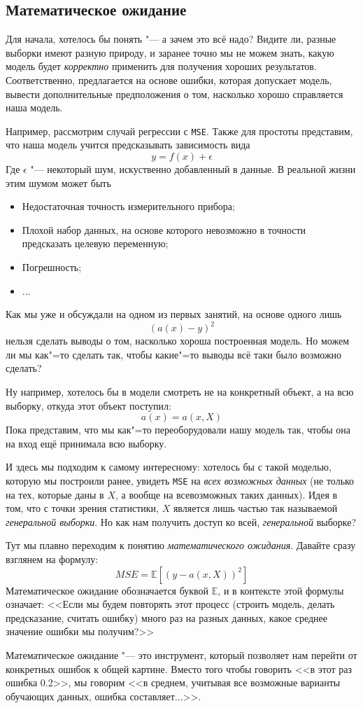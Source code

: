 \subsection*{Математическое ожидание}
Для начала, хотелось бы понять "--- а зачем это всё надо? Видите ли, разные выборки имеют разную природу, и заранее точно мы не можем знать, какую модель будет \textit{корректно} применить для получения хороших результатов. Соответственно, предлагается на основе ошибки, которая допускает модель, вывести дополнительные предположения о том, насколько хорошо справляется наша модель.

Например, рассмотрим случай регрессии с \texttt{MSE}. Также для простоты представим, что наша модель учится предсказывать зависимость вида
\[
y = f(x) + \epsilon
\]
Где $\epsilon$ "--- некоторый шум, искуственно добавленный в данные. В реальной жизни этим шумом может быть
\begin{itemize}
    \item Недостаточная точность измерительного прибора;
    \item Плохой набор данных, на основе которого невозможно в точности предсказать целевую переменную;
    \item Погрешность;
    \item ...
\end{itemize}

Как мы уже и обсуждали на одном из первых занятий, на основе одного лишь
\[
(a(x) - y)^2
\]
нельзя сделать выводы о том, насколько хороша построенная модель. Но можем ли мы как"=то сделать так, чтобы какие"=то выводы всё таки было возможно сделать?

Ну например, хотелось бы в модели смотреть не на конкретный объект, а на всю выборку, откуда этот объект поступил:
\[
a(x) = a(x, X)
\]
Пока представим, что мы как"=то переоборудовали нашу модель так, чтобы она на вход ещё принимала всю выборку.

\newpage

И здесь мы подходим к самому интересному: хотелось бы с такой моделью, которую мы построили ранее, увидеть \texttt{MSE} на \textit{всех возможных данных} (не только на тех, которые даны в $X$, а вообще на всевозможных таких данных). Идея в том, что с точки зрения статистики, $X$ является лишь частью так называемой \textit{генеральной выборки}. Но как нам получить доступ ко всей, \textit{генеральной} выборке?

Тут мы плавно переходим к понятию \textit{математического ожидания}. Давайте сразу взглянем на формулу:
\[
MSE = \mathbb{E}[(y - a(x,X))^2]
\]
Математическое ожидание обозначается буквой $\mathbb{E}$, и в контексте этой формулы означает: <<Если мы будем повторять этот процесс (строить модель, делать предсказание, считать ошибку) много раз на разных данных, какое среднее значение ошибки мы получим?>>

Математическое ожидание "--- это инструмент, который позволяет нам перейти от конкретных ошибок к общей картине. Вместо того чтобы говорить <<в этот раз ошибка 0.2>>, мы говорим <<в среднем, учитывая все возможные варианты обучающих данных, ошибка составляет...>>.